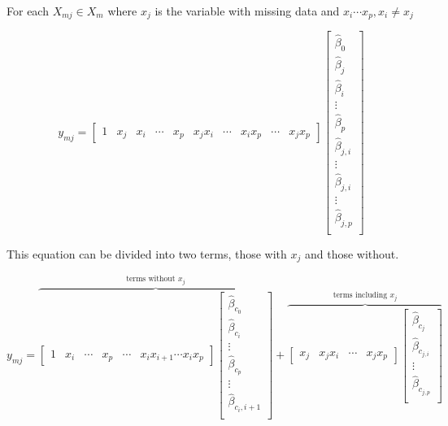 \documentclass[../../paper.tex]{subfiles}
\begin{document}
For each $X_{mj} \in X_{m}$ where $x_{j}$ is the variable with missing data and $x_{i} \cdots x_{p}, x_{i} \neq x_{j}$



\begin{equation}
  y_{mj} =
  \begin{bmatrix}
    1 & x_{j} & x_{i} & \cdots & x_{p} & x_{j}x_{i} & \cdots & x_{i}x_{p} & \cdots & x_{j}x_{p}
  \end{bmatrix}
  \begin{bmatrix}
    \hat{\beta}_{0} \\
    \hat{\beta}_{j} \\
    \hat{\beta}_{i} \\
    \vdots \\
    \hat{\beta}_{p} \\
    \hat{\beta}_{j,i} \\
    \vdots \\
    \hat{\beta}_{j,i} \\
    \vdots \\
    \hat{\beta}_{j, p} \\

  \end{bmatrix}
\end{equation}

This equation can be divided into two terms, those with $x_{j}$ and those without.

\begin{equation}
  y_{mj} =
\overbrace{
  \begin{bmatrix}
    1 & x_{i} & \cdots & x_{p} &  \cdots & x_{i}x_{i+1} \cdots  x_{i}x_{p}
  \end{bmatrix}
  \begin{bmatrix}
    \hat{\beta}_{c_0} \\
    \hat{\beta}_{c_i} \\
    \vdots \\
    \hat{\beta}_{c_p} \\
    \vdots \\
    \hat{\beta}_{c_i,i+1} \\
  \end{bmatrix}}^{\text{terms without } x_{j}}
   +
  \overbrace{
  \begin{bmatrix}
    x_{j} & x_{j}x_{i} & \cdots & x_{j}x_{p}
  \end{bmatrix}
  \begin{bmatrix}
    \hat{\beta}_{c_{j}} \\
    \hat{\beta}_{c_{j,i}} \\
    \vdots \\
    \hat{\beta}_{c_{j,p}} \\
  \end{bmatrix}}^{\text{terms including } x_{j}}
\end{equation}
\end{document}
